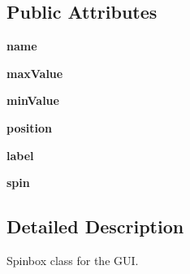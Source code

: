 \subsection*{Public Attributes}
\begin{DoxyCompactItemize}
\item 
\hypertarget{classSpinboxClass_1_1SpinboxClass_a853efed8d820077f22215c9a8f75d8cc}{{\bfseries name}}\label{classSpinboxClass_1_1SpinboxClass_a853efed8d820077f22215c9a8f75d8cc}

\item 
\hypertarget{classSpinboxClass_1_1SpinboxClass_ad3b21f20cb339e97ac7bc56993ce6503}{{\bfseries max\+Value}}\label{classSpinboxClass_1_1SpinboxClass_ad3b21f20cb339e97ac7bc56993ce6503}

\item 
\hypertarget{classSpinboxClass_1_1SpinboxClass_a3ba71911c69d786f8deee897de9887bf}{{\bfseries min\+Value}}\label{classSpinboxClass_1_1SpinboxClass_a3ba71911c69d786f8deee897de9887bf}

\item 
\hypertarget{classSpinboxClass_1_1SpinboxClass_adcae270610302216d1d291dd92324c75}{{\bfseries position}}\label{classSpinboxClass_1_1SpinboxClass_adcae270610302216d1d291dd92324c75}

\item 
\hypertarget{classSpinboxClass_1_1SpinboxClass_a1b5c874bd0afe6998fd01fd03ac8497a}{{\bfseries label}}\label{classSpinboxClass_1_1SpinboxClass_a1b5c874bd0afe6998fd01fd03ac8497a}

\item 
\hypertarget{classSpinboxClass_1_1SpinboxClass_ac68be9f1b64242aa12a958bb932cc00a}{{\bfseries spin}}\label{classSpinboxClass_1_1SpinboxClass_ac68be9f1b64242aa12a958bb932cc00a}

\end{DoxyCompactItemize}


\subsection{Detailed Description}
Spinbox class for the G\+U\+I. 


